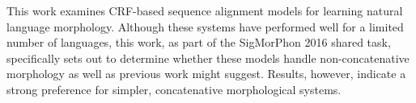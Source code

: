 This work examines CRF-based sequence alignment models for learning natural language morphology. Although these systems have performed well for a limited number of languages, this work, as part of the SigMorPhon 2016 shared task, specifically sets out to determine whether these models handle non-concatenative morphology as well as previous work might suggest. Results, however, indicate a strong preference for simpler, concatenative morphological systems.
